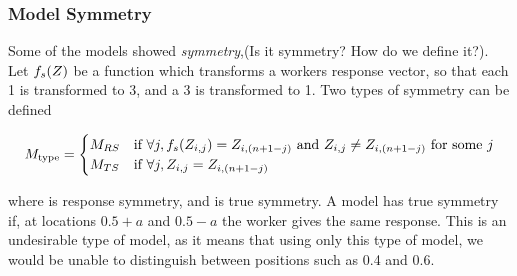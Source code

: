 




\subsubsection{Model Symmetry}
Some of the models showed \textit{symmetry},(Is it symmetry? How do we define it?). Let $f_{s}(Z)$
be a function which transforms a workers response vector, so that each 1 is transformed to 3, and a 3 is transformed to 1. Two types of symmetry can be defined


\[
M_\text{type}=
\begin{cases}

M_{RS} & \text{if } \forall j, f_{s}(Z_{i,j})=Z_{i,(n+1-j)} \text{ and }Z_{i,j}\neq Z_{i,(n+1-j)} \text{ for some } j  \\

M_{TS}      & \text{if } \forall j, Z_{i,j}=Z_{i,(n+1-j)}\\ 
 \end{cases}
\]

where \resSym is response symmetry, and \trueSym is true symmetry. 
A model has true symmetry if, at locations $0.5 + a$ and $0.5 - a$ the worker gives the same response. 
This is an undesirable type of model, as it means that using only this type of model, we would be unable to distinguish between positions such as 0.4 and 0.6.

